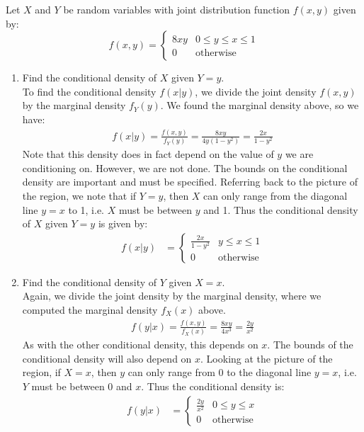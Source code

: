 \documentclass[notes.tex]{subfiles}
\begin{document}
\begin{example}
Let $X$ and $Y$ be random variables with joint distribution function $f(x, y)$ given by:
\[
f(x, y) = \begin{cases} 
      8 x y  & 0 \leq y \leq x \leq 1 \\
      0 & \textrm{otherwise}
   \end{cases}
\]
\begin{enumerate}

\item Find the conditional density of $X$ given $Y = y$.\\

To find the conditional density $f(x|y)$, we divide the joint density $f(x, y)$ by the marginal density $f_Y(y)$. We found the marginal density above, so we have:
\begin{align*}
f(x|y) = \frac{f(x, y)}{f_Y(y)} = \frac{8 x y}{4y(1 - y^2) } = \frac{2x}{1 - y^2} 
\end{align*}
Note that this density does in fact depend on the value of $y$ we are conditioning on. However, we are not done. The bounds on the conditional density are important and must be specified. Referring back to the picture of the region, we note that if $Y = y$, then $X$ can only range from the diagonal line $y = x$ to 1, i.e. $X$ must be between $y$ and 1. Thus the conditional density of $X$ given $Y = y$ is given by:
\begin{align*}
f(x|y) &=  \begin{cases} 
      \frac{2x}{1 - y^2} & y \leq x \leq 1 \\
      0 & \textrm{otherwise}
   \end{cases}
\end{align*}

\item Find the conditional density of $Y$ given $X = x$.\\

Again, we divide the joint density by the marginal density, where we computed the marginal density $f_X(x)$ above.
\begin{align*}
f(y|x) = \frac{f(x, y)}{f_X(x)} = \frac{8 x y}{4x^3} = \frac{2y}{x^2}  
\end{align*}
As with the other conditional density, this depends on $x$. The bounds of the conditional density will also depend on $x$. Looking at the picture of the region, if $X = x$, then $y$ can only range from 0 to the diagonal line $y = x$, i.e. $Y$ must be between 0 and $x$. Thus the conditional density is:
\begin{align*}
f(y|x) &=  \begin{cases} 
      \frac{2y}{x^2}  & 0 \leq y \leq x \\
      0 & \textrm{otherwise}
   \end{cases}
\end{align*}


\end{enumerate}
\end{example}
\end{document}

